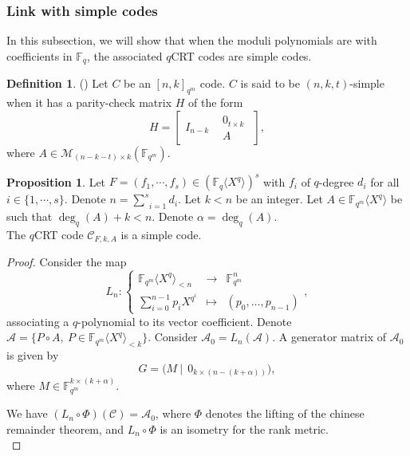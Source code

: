 \documentclass{article}
\newcommand{\Fq}{\mathbb{F}_q}
\newcommand{\Fqm}{\mathbb{F}_{q^m}}
\newcommand{\QP}{\mathbb{F}_{q^m} \langle X^q \rangle}
\theoremstyle{definition}
\newtheorem{proposition}[theorem]{Proposition}
\newtheorem{definition}{Definition}
\begin{document}
\subsubsection{Link with simple codes}
In this subsection, we will show that when the moduli polynomials are with coefficients in $\Fq$, the associated $q$CRT codes are simple codes.
\begin{definition}(\cite{simple})
      Let $C$ be an $[n,k]_{q^m}$ code. $C$ is said to be $(n,k,t)$-simple when it has a parity-check matrix $H$ of the form $$ H = \begin{bmatrix}
                  I_{n-k} & \begin{matrix}
                                  0_{t\times k} \\[3pt]
                                  A
                            \end{matrix}
            \end{bmatrix},$$ where $A\in \mathcal{M}_{ (n-k-t)\times k}(\Fqm)$.
\end{definition}

\begin{proposition}
      Let $F = (f_1, \cdots, f_s) \in (\mathbb{F}_q \langle X^q \rangle)^s$ with $f_i$
      of $q$-degree $d_i$ for all $i \in \{ 1, \cdots, s \}.$  Denote $n = \underset{i = 1}{\overset{s}{\sum}} d_i$. Let $k < n$ be an
      integer. Let $A \in \mathbb{F}_{q^m}\langle X^q \rangle$ be such that $\deg_q(A)+k<n.$ Denote $\alpha = \deg_q(A)$. \\
      The $q$CRT code $\mathcal{C}_{F, k, A}$ is a simple code.
\end{proposition}
\begin{proof}
      Consider the map
      \begin{equation*}
            L_n : \left\{ \begin{array}{rcl} \QP_{<n}             & \to     & \Fqm^n                \\
                         \sum_{i=0}^{n-1}p_iX^{q^i} & \mapsto & (p_0, \dots, p_{n-1})
            \end{array} , \right. \end{equation*}
      associating a $q$-polynomial to its vector coefficient.
      Denote $\mathcal{A} =\{P \circ A,~ P \in \QP_{<k} \}$. Consider $\mathcal{A}_0 = L_n(\mathcal{A})$.
      A generator matrix of $\mathcal{A}_0$ is given by $$ G = \Big(M~|~ \  {0} _{k\times(n-(k+\alpha))}\Big),$$ where $M\in \mathbb{F}_{q^m}^{k\times (k+\alpha)}$.

      We have $(L_n\circ  \Phi)(\mathcal{C})=\mathcal{A}_0$, where $\Phi$ denotes the lifting of the chinese remainder theorem,  and $L_n\circ  \Phi$ is an isometry for the rank metric. \\
\end{proof}
\color{black}
\end{document}
